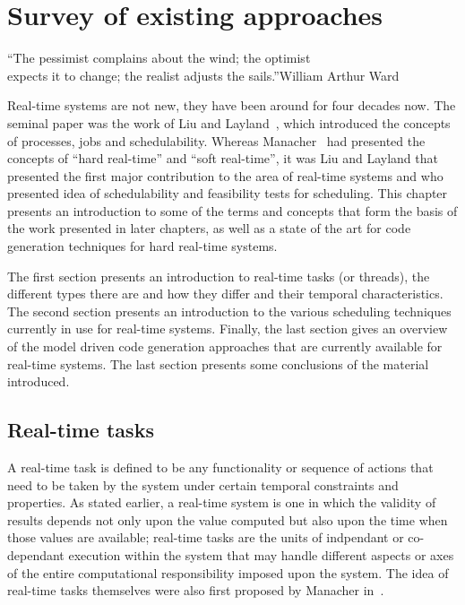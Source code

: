 \chapter{Survey of existing approaches}{``The pessimist complains
  about the wind; the optimist\\expects it to change; the realist
  adjusts the sails.''}{William Arthur Ward}
\label{chap:biblio}

Real-time systems are not new, they have been around for four decades
now. The seminal paper was the work of Liu and
Layland~\cite{liu@jacm73}, which introduced the concepts of processes,
jobs and schedulability. Whereas Manacher~\cite{manacher@jacm67} had
presented the concepts of ``hard real-time'' and ``soft real-time'',
it was Liu and Layland that presented the first major contribution to
the area of real-time systems and who presented idea of schedulability
and feasibility tests for scheduling. This chapter presents an
introduction to some of the terms and concepts that form the basis of
the work presented in later chapters, as well as a state of the art
for code generation techniques for hard real-time systems.

The first section presents an introduction to real-time tasks (or
threads), the different types there are and how they differ and their
temporal characteristics. The second section presents an introduction
to the various scheduling techniques currently in use for real-time
systems. Finally, the last section gives an overview of the model
driven code generation approaches that are currently available for
real-time systems. The last section presents some conclusions of the
material introduced.

\section{Real-time tasks}
A real-time task is defined to be any functionality or sequence of
actions that need to be taken by the system under certain temporal
constraints and properties. As stated earlier, a real-time system is
one in which the validity of results depends not only upon the value
computed but also upon the time when those values are available;
real-time tasks are the units of indpendant or co-dependant execution
within the system that may handle different aspects or axes of the
entire computational responsibility imposed upon the system. The idea
of real-time tasks themselves were also first proposed by Manacher
in~\cite{manacher@jacm67}.

